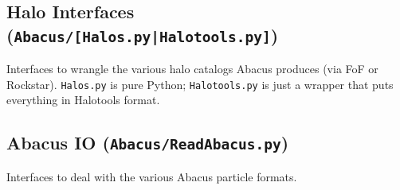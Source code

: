 \documentclass[11pt,preprint]{aastex}
\newenvironment{private}{\comment}{\endcomment}
\newenvironment{private}
    {\textbf{Not public:}\\
    \begin{tabular}{|p{0.9\textwidth}|}
    \hline\\
    }
    {
    \\\\\hline
    \end{tabular}
    }
\begin{document}
\begin{private}
\subsection{Halo Interfaces (\texttt{Abacus/[Halos.py|Halotools.py]})}
Interfaces to wrangle the various halo catalogs Abacus produces (via FoF or Rockstar).
\texttt{Halos.py} is pure Python; \texttt{Halotools.py} is just a wrapper that puts
everything in Halotools format.

\subsection{Abacus IO (\texttt{Abacus/ReadAbacus.py})}
Interfaces to deal with the various Abacus particle formats.

\end{private}
\end{document}
